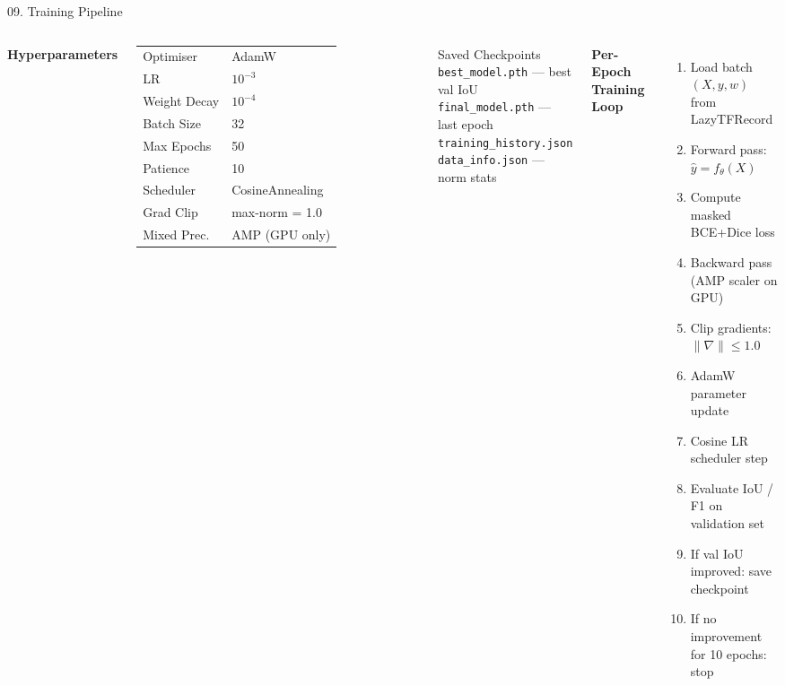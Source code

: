 ﻿\documentclass[aspectratio=169,t]{beamer}
\begin{document}
\begin{frame}{09. Training Pipeline}
\begin{columns}[t]
\textcolor{accent}{\textbf{Hyperparameters}}\\[0.1cm]
\small
\begin{tabular}{ll}
\textcolor{accent}{Optimiser}    & AdamW \\
\textcolor{accent}{LR}           & $10^{-3}$ \\
\textcolor{accent}{Weight Decay} & $10^{-4}$ \\
\textcolor{accent}{Batch Size}   & 32 \\
\textcolor{accent}{Max Epochs}   & 50 \\
\textcolor{accent}{Patience}     & 10 \\
\textcolor{accent}{Scheduler}    & CosineAnnealing \\
\textcolor{accent}{Grad Clip}    & max-norm = 1.0 \\
\textcolor{accent}{Mixed Prec.}  & AMP (GPU only) \\
\end{tabular}
\vspace{0.2cm}
\begin{exampleblock}{Saved Checkpoints}
\small
\texttt{best\_model.pth} --- best val IoU\\
\texttt{final\_model.pth} --- last epoch\\
\texttt{training\_history.json}\\
\texttt{data\_info.json} --- norm stats
\end{exampleblock}
\textcolor{accent}{\textbf{Per-Epoch Training Loop}}\\[0.1cm]
\begin{enumerate}\small
  \item Load batch $(X, y, w)$ from LazyTFRecord
  \item Forward pass: $\hat{y} = f_\theta(X)$
  \item Compute masked BCE+Dice loss
  \item Backward pass (AMP scaler on GPU)
  \item Clip gradients: $\|\nabla\| \leq 1.0$
  \item AdamW parameter update
  \item Cosine LR scheduler step
  \item Evaluate IoU / F1 on validation set
  \item If val IoU improved: save checkpoint
  \item If no improvement for 10 epochs: stop
\end{enumerate}
\end{columns}
\end{frame}
\end{document}
